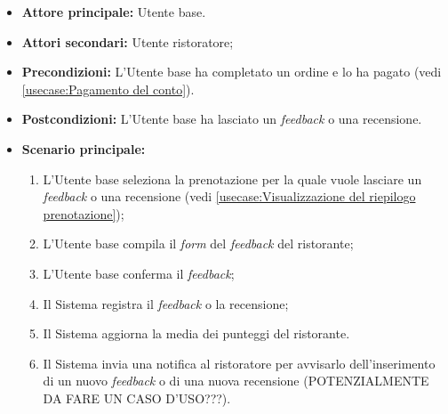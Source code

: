 \label{usecase:Inserimento di feedback e recensioni}
\begin{itemize}
	\item \textbf{Attore principale:} Utente base.

	\item \textbf{Attori secondari:} Utente ristoratore;


	\item \textbf{Precondizioni:} L'Utente base ha completato un ordine e lo ha pagato (vedi \autoref{usecase:Pagamento del conto}).

	\item \textbf{Postcondizioni:} L'Utente base ha lasciato un \textit{feedback} o una recensione.

	\item \textbf{Scenario principale:}
	      \begin{enumerate}
		      \item L'Utente base seleziona la prenotazione per la quale vuole
		            lasciare un \textit{feedback} o una recensione (vedi
		            \autoref{usecase:Visualizzazione del riepilogo prenotazione});

		      \item L'Utente base compila il \textit{form} del \textit{feedback} del ristorante;

		      \item L'Utente base conferma il \textit{feedback};

		      \item Il Sistema registra il \textit{feedback} o la recensione;

		      \item Il Sistema aggiorna la media dei punteggi del ristorante.

		      \item Il Sistema invia una notifica al ristoratore per avvisarlo
		            dell'inserimento di un nuovo \textit{feedback} o di una nuova
		            recensione (POTENZIALMENTE DA FARE UN CASO D'USO???).
	      \end{enumerate}
\end{itemize}
